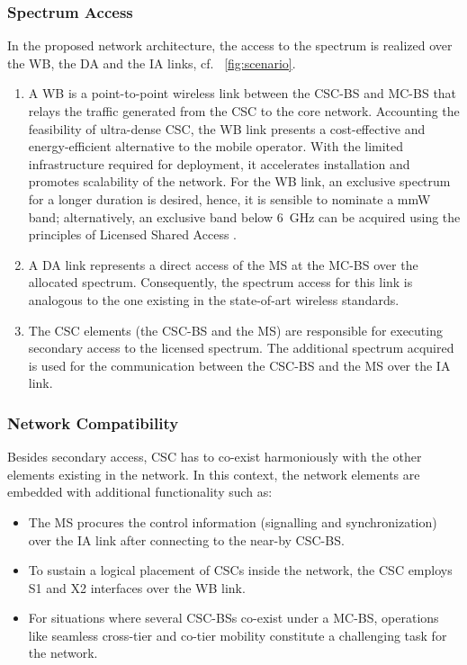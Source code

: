\subsubsection*{Spectrum Access}
In the proposed network architecture, the access to the spectrum is realized over the WB, the DA and the IA links, cf. \figurename~\ref{fig:scenario}.
\begin{enumerate}
\item A WB is a
point-to-point wireless link between the CSC-BS and MC-BS that relays the traffic generated from the CSC to the core network. Accounting the feasibility of ultra-dense CSC, the WB link presents a cost-effective and energy-efficient alternative to the mobile operator.
With the limited infrastructure required for deployment, it accelerates installation and promotes scalability of the network.
For the WB link, an exclusive spectrum for a longer duration is desired, hence, it is sensible to nominate a mmW band; alternatively, an exclusive band below \SI{6}{GHz} can be acquired using the principles of Licensed Shared Access \cite{ETSI13}.

\item A DA link represents a direct access of the MS at the MC-BS over the allocated spectrum. Consequently, the spectrum access for this link is analogous to the one existing in the state-of-art wireless standards.
\item The CSC elements (the CSC-BS and the MS) are responsible for executing secondary access to the licensed spectrum. The additional spectrum acquired is used for the communication between the CSC-BS and the MS over the IA link.
\end{enumerate}

\subsubsection*{Network Compatibility}
Besides secondary access, CSC has to co-exist harmoniously with the other elements existing in the network. In this context, the network elements are embedded with additional functionality such as:
\begin{itemize}
\item The MS procures the control information (signalling and synchronization) over the IA link after connecting to the near-by CSC-BS.
\item To sustain a logical placement of CSCs inside the network, the CSC employs S1 and X2 interfaces over the WB link.
\item For situations where several CSC-BSs co-exist under a MC-BS, operations like seamless cross-tier and co-tier mobility constitute a challenging task for the network.
\end{itemize}


